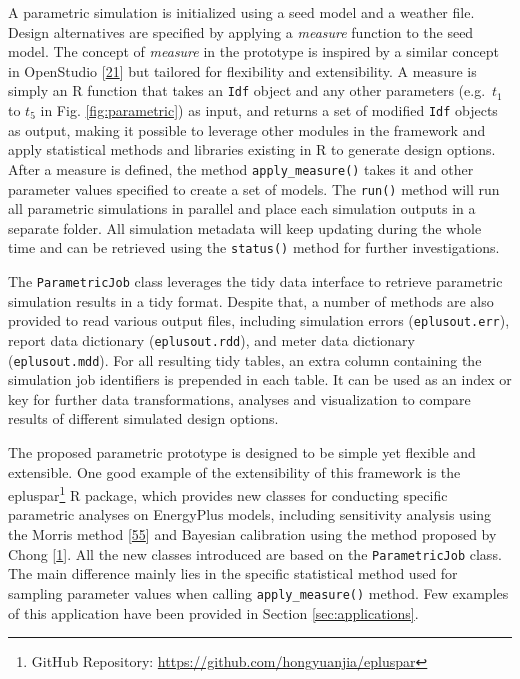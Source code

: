 \documentclass[3p, times]{elsarticle} %
\begin{document}
A parametric simulation is initialized using a seed model and a weather file.
Design alternatives are specified by applying a \emph{measure} function to the seed
model. The concept of \emph{measure} in the prototype is inspired by a similar
concept in OpenStudio {[}\protect\hyperlink{ref-Guglielmetti2011}{21}{]} but tailored for flexibility and
extensibility. A measure is simply an R function that takes an \texttt{Idf} object and
any other parameters (e.g.~\(t_1\) to \(t_5\) in Fig. \ref{fig:parametric}) as
input, and returns a set of modified \texttt{Idf} objects as output, making it possible
to leverage other modules in the framework and apply statistical methods and
libraries existing in R to generate design options. After a measure is defined,
the method \texttt{apply\_measure()} takes it and other parameter values specified to
create a set of models. The \texttt{run()} method will run all parametric simulations
in parallel and place each simulation outputs in a separate folder. All
simulation metadata will keep updating during the whole time and can be
retrieved using the \texttt{status()} method for further investigations.

The \texttt{ParametricJob} class leverages the tidy data interface to retrieve
parametric simulation results in a tidy format. Despite that, a number of
methods are also provided to read various output files, including simulation
errors (\texttt{eplusout.err}), report data dictionary (\texttt{eplusout.rdd}), and meter data
dictionary (\texttt{eplusout.mdd}). For all resulting tidy tables, an extra column
containing the simulation job identifiers is prepended in each table. It can be
used as an index or key for further data transformations, analyses and
visualization to compare results of different simulated design options.

The proposed parametric prototype is designed to be simple yet flexible and
extensible. One good example of the extensibility of this framework is the
epluspar\footnote{GitHub Repository: \url{https://github.com/hongyuanjia/epluspar}} R package, which provides new classes for conducting specific
parametric analyses on EnergyPlus models, including sensitivity analysis using
the Morris method {[}\protect\hyperlink{ref-Morris1991}{55}{]} and Bayesian calibration using the method
proposed by Chong {[}\protect\hyperlink{ref-Chong2017}{1}{]}. All the new classes introduced are based on the
\texttt{ParametricJob} class. The main difference mainly lies in the specific
statistical method used for sampling parameter values when calling
\texttt{apply\_measure()} method. Few examples of this application have been provided in
Section \ref{sec:applications}.
\end{document}
